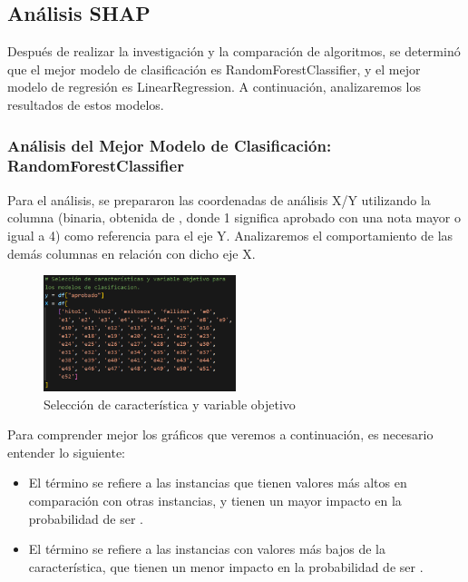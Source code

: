 \subsection{Análisis SHAP}

Después de realizar la investigación y la comparación de algoritmos, se determinó que el mejor modelo de clasificación es RandomForestClassifier, y el mejor modelo de regresión es LinearRegression. A continuación, analizaremos los resultados de estos modelos.

\subsubsection{Análisis del Mejor Modelo de Clasificación: RandomForestClassifier}


Para el análisis, se prepararon las coordenadas de análisis X/Y utilizando la columna  (binaria, obtenida de , donde 1 significa aprobado con una nota mayor o igual a 4) como referencia para el eje Y. Analizaremos el comportamiento de las demás columnas en relación con dicho eje X.

\begin{figure}[H]
    \centering
    \includegraphics[width=0.5\textwidth]{img/shap_rf/conjunto_clasificacion.png}
    \caption{Selección de característica y variable objetivo}
    \label{fig:variables_entrenamiento}
\end{figure}

Para comprender mejor los gráficos que veremos a continuación, es necesario entender lo siguiente:

\begin{itemize}
    \item El término  se refiere a las instancias que tienen valores más altos en comparación con otras instancias, y tienen un mayor impacto en la probabilidad de ser .
    \item El término  se refiere a las instancias con valores más bajos de la característica, que tienen un menor impacto en la probabilidad de ser .
\end{itemize}

